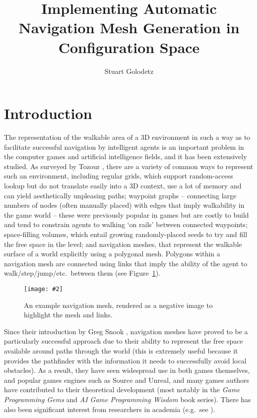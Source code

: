 \documentclass[10pt,twocolumn]{article}
\newcommand{\stufigex}[5]					%
{
	\begin{figure}[#5]
	\begin{center}
		\texttt{[image: \#2]}
		\caption{#3}
		\label{#4}
	\end{center}
	\end{figure}
}
\begin{document}
\title{Implementing Automatic Navigation Mesh Generation in Configuration Space}
\author{Stuart Golodetz}
\date{}
\maketitle

\section*{Introduction}

The representation of the walkable area of a 3D environment in such a way as to facilitate successful navigation by intelligent agents is an important problem in the computer games and artificial intelligence fields, and it has been extensively studied. As surveyed by Tozour \cite{tozour04}, there are a variety of common ways to represent such an environment, including regular grids, which support random-access lookup but do not translate easily into a 3D context, use a lot of memory and can yield aesthetically unpleasing paths; waypoint graphs -- connecting large numbers of nodes (often manually placed) with edges that imply walkability in the game world -- these were previously popular in games but are costly to build and tend to constrain agents to walking `on rails' between connected waypoints; space-filling volumes, which entail growing randomly-placed seeds to try and fill the free space in the level; and navigation meshes, that represent the walkable surface of a world explicitly using a polygonal mesh. Polygons within a navigation mesh are connected using links that imply the ability of the agent to walk/step/jump/etc.\ between them (see Figure~\ref{fig:1}).

\stufigex{width=.9\linewidth}{blakeney-midramp-neg.png}{An example navigation mesh, rendered as a negative image to highlight the mesh and links.}{fig:1}{t}

Since their introduction by Greg Snook \cite{snook00}, navigation meshes have proved to be a particularly successful approach due to their ability to represent the free space available around paths through the world (this is extremely useful because it provides the pathfinder with the information it needs to successfully avoid local obstacles). As a result, they have seen widespread use in both games themselves, and popular games engines such as Source and Unreal, and many games authors have contributed to their theoretical development (most notably in the \emph{Game Programming Gems} and \emph{AI Game Programming Wisdom} book series). There has also been significant interest from researchers in academia (e.g.~see \cite{hale09,kallmann10,pettre05,vantoll11}).
\end{document}
